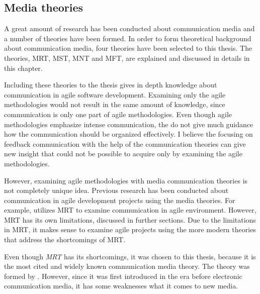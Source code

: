 \documentclass[english,12pt,a4paper,pdftex]{article}
\begin{document}
\subsection{Media theories}
\label{sec:media_theories}

A great amount of research has been conducted about communication media and a number of theories have been formed. In order to form theoretical background about communication media, four theories have been selected to this thesis. The theories, \acl{MRT}, \acl{MST}, \acl{MNT} and \acl{MFT}, are explained and discussed in details in this chapter.

Including these theories to the thesis gives in depth knowledge about communication in agile software development. Examining only the agile methodologies would not result in the same amount of knowledge, since communication is only one part of agile methodologies. Even though agile methodologies emphasize intense communication, the do not give much guidance how the communication should be organized effectively. I believe the focusing on feedback communication with the help of the communication theories can give new insight that could not be possible to acquire only by examining the agile methodologies.

However, examining agile methodologies with media communication theories is not completely unique idea. Previous research has been conducted about communication in agile development projects using the media theories. For example, \citet{korkala2006} utilizes \ac{MRT} to examine communication in agile environment. However, \ac{MRT} has its own limitations, discussed in further sections. Due to the limitations in \ac{MRT}, it makes sense to examine agile projects using the more modern theories that address the shortcomings of \ac{MRT}.

Even though \emph{\acl{MRT}} has its shortcomings, it was chosen to this thesis, because it is the most cited and widely known communication media theory. The theory was formed by \citet{daft1986}. However, since it was first introduced in the era before electronic communication media, it has some weaknesses what it comes to new media.
\end{document}
